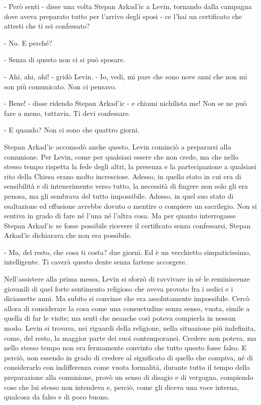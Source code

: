 - Però senti - disse una volta Stepan Arkad'ic a Levin, tornando dalla campagna dove aveva preparato tutto per l'arrivo degli sposi - ce l'hai un certificato che attesti che ti sei confessato? 

- No. E perché? 

- Senza di questo non ci si può sposare. 

- Ahi, ahi, ahi! - gridò Levin. - Io, vedi, mi pare che sono nove anni che non mi son più comunicato. Non ci pensavo. 

- Bene! - disse ridendo Stepan Arkad'ic - e chiami nichilista me! Non se ne può fare a meno, tuttavia. Ti devi confessare. 

- E quando? Non ci sono che quattro giorni. 

Stepan Arkad'ic accomodò anche questo. Levin cominciò a prepararsi alla comunione. Per Levin, come per qualsiasi essere che non crede, ma che nello stesso tempo rispetta la fede degli altri, la presenza e la partecipazione a qualsiasi rito della Chiesa erano molto incresciose. Adesso, in quello stato in cui era di sensibilità e di intenerimento verso tutto, la necessità di fingere non solo gli era penosa, ma gli sembrava del tutto impossibile. Adesso, in quel suo stato di esaltazione ed effusione avrebbe dovuto o mentire o compiere un sacrilegio. Non si sentiva in grado di fare né l'una né l'altra cosa. Ma per quanto interrogasse Stepan Arkad'ic se fosse possibile ricevere il certificato senza confessarsi, Stepan Arkad'ic dichiarava che non era possibile. 

- Ma, del resto, che cosa ti costa? due giorni. Ed è un vecchietto simpaticissimo, intelligente. Ti caverà questo dente senza fartene accorgere. 

Nell'assistere alla prima messa, Levin si sforzò di ravvivare in sé le reminiscenze giovanili di quel forte sentimento religioso che aveva provato fra i sedici e i diciassette anni. Ma subito si convinse che era assolutamente impossibile. Cercò allora di considerare la cosa come una consuetudine senza senso, vuota, simile a quella di far le visite; ma sentì che neanche così poteva compierla in nessun modo. Levin si trovava, nei riguardi della religione, nella situazione più indefinita, come, del resto, la maggior parte dei suoi contemporanei. Credere non poteva, ma nello stesso tempo non era fermamente convinto che tutto questo fosse falso. E perciò, non essendo in grado di credere al significato di quello che compiva, né di considerarlo con indifferenza come vuota formalità, durante tutto il tempo della preparazione alla comunione, provò un senso di disagio e di vergogna, compiendo cose che lui stesso non intendeva e, perciò, come gli diceva una voce interna, qualcosa da falso e di poco buono. 

